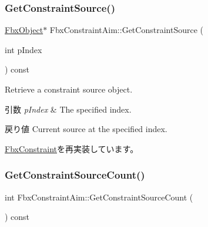 \mbox{\label{class_fbx_constraint_aim_ae5d3634ababc5cb0af0734b41c78218a}} 
\subsubsection{\texorpdfstring{Get\+Constraint\+Source()}{GetConstraintSource()}}
{\footnotesize\ttfamily \hyperlink{class_fbx_object}{Fbx\+Object}$\ast$ Fbx\+Constraint\+Aim\+::\+Get\+Constraint\+Source (\begin{DoxyParamCaption}\item[{int}]{p\+Index }\end{DoxyParamCaption}) const\hspace{0.3cm}{\ttfamily [virtual]}}

Retrieve a constraint source object. 
\begin{DoxyParams}{引数}
{\em p\+Index} & The specified index. \\
\hline
\end{DoxyParams}
\begin{DoxyReturn}{戻り値}
Current source at the specified index. 
\end{DoxyReturn}


\hyperlink{class_fbx_constraint_a5ff6fe6fc98af1e33e8b297bc1cea007}{Fbx\+Constraint}を再実装しています。

\mbox{\label{class_fbx_constraint_aim_aa58f34b660f30caff3f89c5372a25a5c}} 
\subsubsection{\texorpdfstring{Get\+Constraint\+Source\+Count()}{GetConstraintSourceCount()}}
{\footnotesize\ttfamily int Fbx\+Constraint\+Aim\+::\+Get\+Constraint\+Source\+Count (\begin{DoxyParamCaption}{ }\end{DoxyParamCaption}) const\hspace{0.3cm}{\ttfamily [virtual]}}

